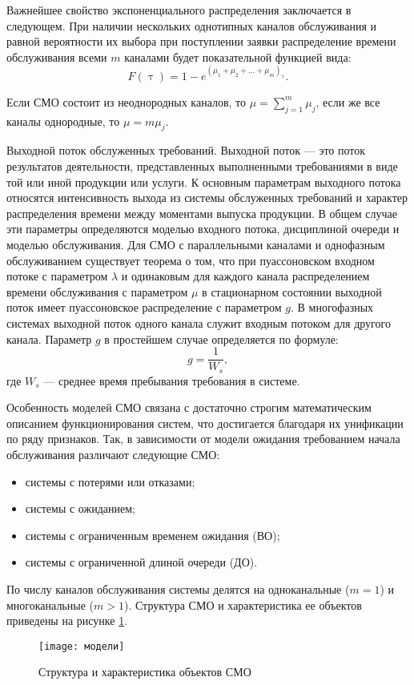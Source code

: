 Важнейшее свойство экспоненциального распределения заключается в следующем. При наличии нескольких однотипных каналов обслуживания и равной вероятности их выбора при поступлении заявки распределение времени обслуживания всеми $m$ каналами будет показательной функцией вида:
\[F(\uptau) = 1-e^{(\mu_1 +\mu_2 + ... + \mu_m)_{\uptau}}.\]

Если СМО состоит из неоднородных каналов, то $\mu = \sum\limits_{j=1}^m\mu_j$, если же все каналы однородные, то $\mu = m \mu_j$.

Выходной поток обслуженных требований. Выходной поток — это поток результатов деятельности, представленных выполненными требованиями в виде той или иной продукции или услуги. К основным параметрам выходного потока относятся интенсивность выхода из системы обслуженных требований и характер распределения времени между моментами выпуска продукции. В общем случае эти параметры определяются моделью входного потока, дисциплиной очереди и моделью обслуживания. Для СМО с параллельными каналами и однофазным обслуживанием существует теорема о том, что при пуассоновском входном потоке с параметром $\lambda$ и одинаковым для каждого канала распределением времени обслуживания с параметром $\mu$ в стационарном состоянии выходной поток имеет пуассоновское распределение с параметром $g$. В многофазных системах выходной поток одного канала служит входным потоком для другого канала. Параметр $g$ в простейшем случае определяется по формуле:
\[g=\dfrac{1}{W_s},\]
где $W_s$ --- среднее время пребывания требования в системе.

Особенность моделей СМО связана с достаточно строгим математическим описанием функционирования систем, что достигается благодаря их унификации по ряду признаков. Так, в зависимости от модели ожидания требованием начала обслуживания различают следующие СМО:
\begin{itemize}
	\item системы с потерями или отказами;
	\item системы с ожиданием;
	\item системы с ограниченным временем ожидания (ВО);
\item системы с ограниченной длиной очереди (ДО).
\end{itemize}

По числу каналов обслуживания системы делятся на одноканальные ($m = 1$) и многоканальные ($m > 1$). Структура СМО и характеристика ее объектов приведены на рисунке \ref{fig:}.

\begin{figure}
	\centering
	\texttt{[image: модели]}
	\caption{Структура и характеристика объектов СМО}
	\label{fig:}
\end{figure}



